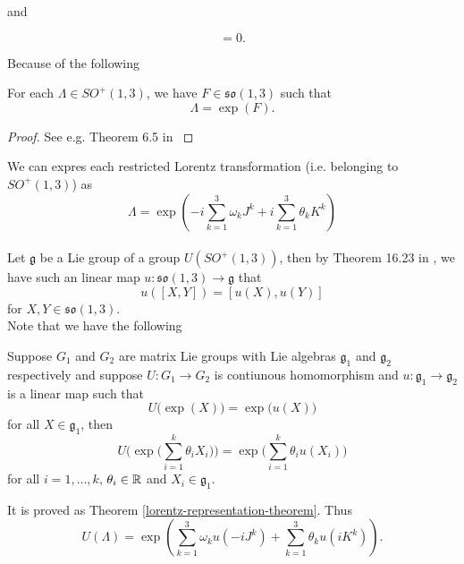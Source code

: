 \documentclass[main.tex]{subfiles}
\begin{document}
and

\begin{equation}
[A^i, B^j] = 0.
\end{equation}

Because of the following
\begin{theorem}
For each $\Lambda\in SO^{+}(1, 3)$, we have $F\in \mathfrak{so}(1,3)$ such that
\begin{equation}
\Lambda = \exp(F).
\end{equation}
\end{theorem}
\begin{proof}
See e.g. Theorem 6.5 in \cite{hall2004}
\end{proof}

We can expres each restricted Lorentz transformation (i.e. belonging to $SO^{+}(1, 3)$) as 
\begin{equation}
\Lambda = \exp(-i\sum_{k=1}^3 \omega_k J^k + i\sum_{k=1}^3 \theta_k K^k)
\end{equation}\\

Let $\mathfrak{g}$ be a Lie group of a group $U(SO^{+}(1, 3))$, then by Theorem 16.23 in \cite{hall2013}, we have such an linear map $u: \mathfrak{so}(1,3)\to \mathfrak{g}$ that 
\begin{equation}
\label{commutator-conserving-law}
u([X, Y]) = [u(X), u(Y)]
\end{equation}
for $X, Y\in \mathfrak{so}(1,3)$.\\

Note that we have the following
\begin{lemma}
Suppose $G_1$ and $G_2$ are matrix Lie groups with Lie algebras $\mathfrak{g}_1$ and 
$\mathfrak{g}_2$ respectively and suppose $U:G_1\to G_2$ is contiunous homomorphism and $u: \mathfrak{g}_1\to \mathfrak{g}_2$ is a linear map such that
\begin{equation}
U\big(\exp(X)\big) = \exp\big(u(X)\big)
\end{equation}
for all $X\in \mathfrak{g}_1$, then
\begin{equation}
U\big(\exp\big(\sum_{i=1}^k \theta_i X_i\big)\big) = \exp\big(\sum_{i=1}^k \theta_i u(X_i)\big)
\end{equation}
for all $i=1, \dots, k$, $\theta_i\in \mathbb{R}$ and $X_i\in \mathfrak{g}_1$.
\end{lemma}

It is proved as Theorem \ref{lorentz-representation-theorem}.
Thus
\begin{equation}
U(\Lambda) = \exp(\sum_{k=1}^3 \omega_k u(-iJ^k) + \sum_{k=1}^3  \theta_ku(i K^k)).
\end{equation}
\end{document}
